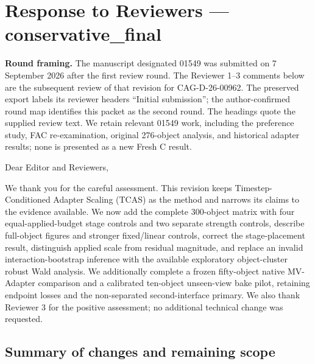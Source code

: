 \documentclass[
  10pt,
]{article}
\author{}
\date{}
\begin{document}
\hypertarget{response-to-reviewers-conservative_final}{%
\section{Response to Reviewers ---
conservative\_final}\label{response-to-reviewers-conservative_final}}

\textbf{Round framing.} The manuscript designated 01549 was submitted on
7 September 2026 after the first review round. The Reviewer 1--3
comments below are the subsequent review of that revision for
CAG-D-26-00962. The preserved export labels its reviewer headers
``Initial submission''; the author-confirmed round map identifies this
packet as the second round. The headings quote the supplied review text.
We retain relevant 01549 work, including the preference study, FAC
re-examination, original 276-object analysis, and historical adapter
results; none is presented as a new Fresh C result.

Dear Editor and Reviewers,

We thank you for the careful assessment. This revision keeps
Timestep-Conditioned Adapter Scaling (TCAS) as the method and narrows
its claims to the evidence available. We now add the complete 300-object
matrix with four equal-applied-budget stage controls and two separate
strength controls, describe full-object figures and stronger
fixed/linear controls, correct the stage-placement result, distinguish
applied scale from residual magnitude, and replace an invalid
interaction-bootstrap inference with the available exploratory
object-cluster robust Wald analysis. We additionally complete a frozen
fifty-object native MV-Adapter comparison and a calibrated ten-object
unseen-view bake pilot, retaining endpoint losses and the non-separated
second-interface primary. We also thank Reviewer 3 for the positive
assessment; no additional technical change was requested.

\hypertarget{summary-of-changes-and-remaining-scope}{%
\subsection{Summary of changes and remaining
scope}\label{summary-of-changes-and-remaining-scope}}
\end{document}
